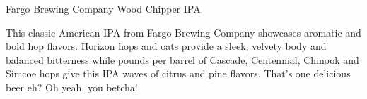 \begin{recipie}{Fargo Brewing Company Wood Chipper IPA}

\begin{aboutblock}
This classic American IPA from Fargo Brewing Company showcases aromatic and bold
hop flavors. Horizon hops and oats provide a sleek, velvety body and balanced bitterness
while pounds per barrel of Cascade, Centennial, Chinook and Simcoe hops give this IPA
waves of citrus and pine flavors. That's one delicious beer eh? Oh yeah, you betcha!
\end{aboutblock}


\begin{methodandtiming}
 
\begin{mashsteps}
\end{mashsteps}

\end{methodandtiming}

\pagebreak

\begin{ingredientsblock}

\begin{malts}
\end{malts}

\begin{hops}
\end{hops}

\begin{yeasts}
\end{yeasts}

\end{ingredientsblock}

\end{recipie}

